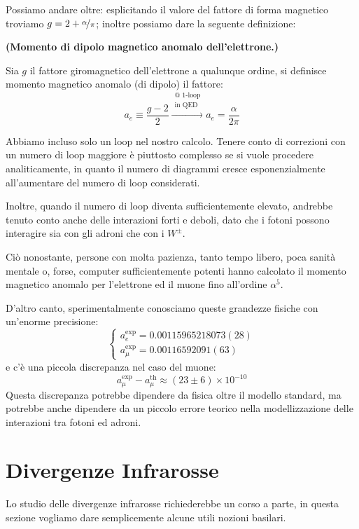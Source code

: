 \documentclass[../main.tex]{subfiles}
\begin{document}
Possiamo andare oltre: esplicitando il valore del fattore di forma magnetico troviamo \(g=2+\nicefrac{\alpha}{\pi}\); inoltre possiamo dare la seguente definizione:
\begin{definition}
    \textbf{(Momento di dipolo magnetico anomalo dell'elettrone.)}

    Sia $g$ il fattore giromagnetico dell'elettrone a qualunque ordine, si definisce momento magnetico anomalo (di dipolo) il fattore:
    \begin{equation}
        a_e\equiv\frac{g-2}{2} \xrightarrow[]{\substack{\text{@ 1-loop}\\\text{in QED}}} a_e=\frac{\alpha}{2\pi}
        \label{eq:anomalous_magn_mom}
    \end{equation}
\end{definition}

\begin{nota}
    Abbiamo incluso solo un loop nel nostro calcolo. Tenere conto di correzioni con un numero di loop maggiore è piuttosto complesso se si vuole procedere analiticamente, in quanto il numero di diagrammi cresce esponenzialmente all'aumentare del numero di loop considerati.
    
    Inoltre, quando il numero di loop diventa sufficientemente elevato, andrebbe tenuto conto anche delle interazioni forti e deboli, dato che i fotoni possono interagire sia con gli adroni che con i \(W^\pm\).
    
    Ciò nonostante, persone con molta pazienza, tanto tempo libero, poca sanità mentale o, forse, computer sufficientemente potenti hanno calcolato il momento magnetico anomalo per l'elettrone ed il muone fino all'ordine $\alpha^5$.
    
    D'altro canto, sperimentalmente conosciamo queste grandezze fisiche con un'enorme precisione:
    \[
    \begin{cases}
        a_e^\text{exp} = 0.00115965218073(28)\\
        a_\mu^\text{exp} = 0.00116592091(63)
    \end{cases}
    \]
    e c'è una piccola discrepanza nel caso del muone:
    \[
     a_\mu^\text{exp} -  a_\mu^\text{th} \approx(23\pm6) \times 10^{-10}
    \]
    Questa discrepanza potrebbe dipendere da fisica oltre il modello standard, ma potrebbe anche dipendere da un piccolo errore teorico nella modellizzazione delle interazioni tra fotoni ed adroni.
\end{nota}


\section{Divergenze Infrarosse}
Lo studio delle divergenze infrarosse richiederebbe un corso a parte, in questa sezione vogliamo dare semplicemente alcune utili nozioni basilari.
\end{document}
